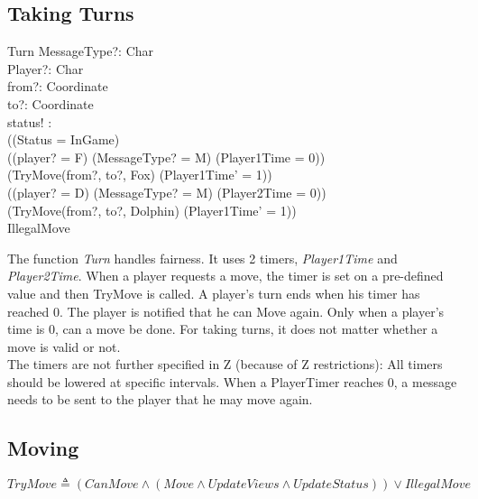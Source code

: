 \documentclass[a4paper,twoside,11pt]{book}
\begin{document}

\subsection{Taking Turns} %
\label{sub:taking_turns}

\begin{schema}{Turn}
  MessageType?: Char \\
  Player?: Char \\
  from?: Coordinate \\
  to?: Coordinate \\
  status! :  \\
  \ST
  ((Status = InGame) \wedge \\
  ((player? = F) \wedge (MessageType? = M) \wedge (Player1Time = 0)) \Rightarrow \\
   (TryMove(from?, to?, Fox) \wedge (Player1Time' = 1))\\
  ((player? = D) \wedge (MessageType? = M) \wedge (Player2Time = 0)) \Rightarrow \\ (TryMove(from?, to?, Dolphin) \wedge (Player1Time' = 1))\\
  \vee IllegalMove \\
\end{schema}
The function \emph{Turn} handles fairness. It uses 2 timers, \emph{Player1Time} and \emph{Player2Time}. When a player requests a move, the timer is set on a pre-defined value and then TryMove is called. A player's turn ends when his timer has reached 0. The player is notified that he can Move again. Only when a player's time is 0, can a move be done. For taking turns, it does not matter whether a move is valid or not.\\
The timers are not further specified in Z (because of Z restrictions): All timers should be lowered at specific intervals. When a PlayerTimer reaches 0, a message needs to be sent to the player that he may move again.


\subsection{Moving} %
\label{sub:moving}

$TryMove \triangleq (CanMove \wedge (Move  \wedge UpdateViews \wedge UpdateStatus)) \vee IllegalMove$ \\
\end{document}
